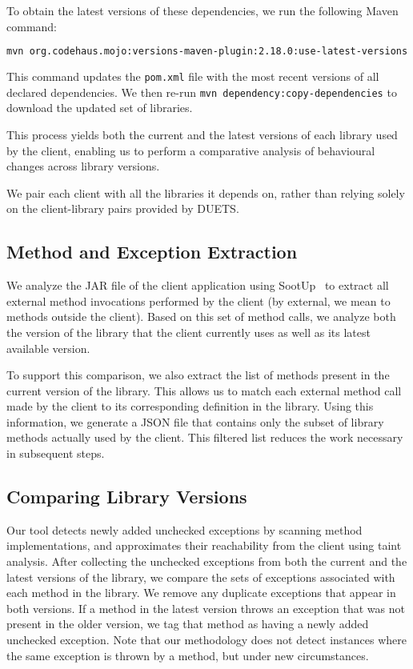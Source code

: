 To obtain the latest versions of these dependencies, we run the following Maven command:
\begin{lstlisting}[language=bash, breaklines=true, basicstyle=\ttfamily\small]
mvn org.codehaus.mojo:versions-maven-plugin:2.18.0:use-latest-versions
\end{lstlisting}
This command updates the \texttt{pom.xml} file with the most recent versions of all declared dependencies. We then re-run \texttt{mvn dependency:copy-dependencies} to download the updated set of libraries.

This process yields both the current and the latest versions of each library used by the client, enabling us to perform a comparative analysis of behavioural changes across library versions.

We pair each client with all the libraries it depends on, rather than relying solely on the client-library pairs provided by DUETS.

\subsection{Method and Exception Extraction}

We analyze the JAR file of the client application using SootUp~\cite{Karakaya24:_sootup} to extract all external method invocations performed by the client (by external, we mean to methods outside the client). Based on this set of method calls, we analyze both the version of the library that the client currently uses as well as its latest available version.

To support this comparison, we also extract the list of methods present in the current version of the library. This allows us to match each external method call made by the client to its corresponding definition in the library. Using this information, we generate a JSON file that contains only the subset of library methods actually used by the client. This filtered list reduces the work necessary in subsequent steps.

\subsection{Comparing Library Versions}

Our tool detects newly added unchecked exceptions by scanning method implementations, and approximates their reachability from the client using taint analysis. After collecting the unchecked exceptions from both the current and the latest versions of the library, we compare the sets of exceptions associated with each method in the library. We remove any duplicate exceptions that appear in both versions. If a method in the latest version throws an exception that was not present in the older version, we tag that method as having a newly added unchecked exception. Note that our methodology does not detect instances where the same exception is thrown by a method, but under new circumstances.

